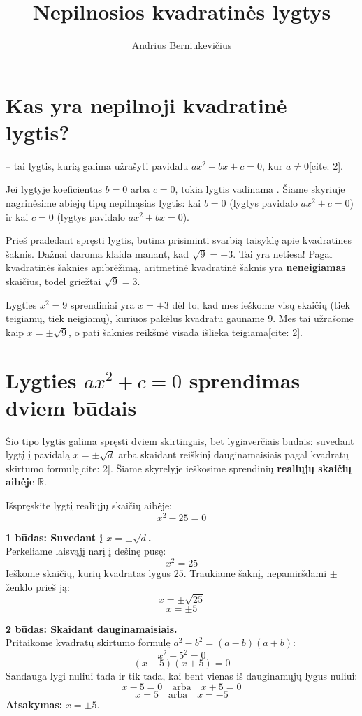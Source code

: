 \documentclass[11pt,a4paper]{scrartcl}
\title{Nepilnosios kvadratinės lygtys}
\author{Andrius Berniukevičius}
\begin{document}
\maketitle

\section{Kas yra nepilnoji kvadratinė lygtis?}

\begin{definition}
 -- tai lygtis, kurią galima užrašyti pavidalu $ax^2+bx+c=0$, kur $a \neq 0$[cite: 2].
\end{definition}

Jei lygtyje koeficientas $b=0$ arba $c=0$, tokia lygtis vadinama . Šiame skyriuje nagrinėsime abiejų tipų nepilnąsias lygtis: kai $b=0$ (lygtys pavidalo $ax^2+c=0$) ir kai $c=0$ (lygtys pavidalo $ax^2+bx=0$).

\begin{remark}
Prieš pradedant spręsti lygtis, būtina prisiminti svarbią taisyklę apie kvadratines šaknis. Dažnai daroma klaida manant, kad $\sqrt{9} = \pm 3$. Tai yra netiesa! Pagal kvadratinės šaknies apibrėžimą, aritmetinė kvadratinė šaknis yra \textbf{neneigiamas} skaičius, todėl griežtai $\sqrt{9} = 3$. 

Lygties $x^2 = 9$ sprendiniai yra $x = \pm 3$ dėl to, kad mes ieškome visų skaičių (tiek teigiamų, tiek neigiamų), kuriuos pakėlus kvadratu gauname $9$. Mes tai užrašome kaip $x = \pm\sqrt{9}$, o pati šaknies reikšmė visada išlieka teigiama[cite: 2].
\end{remark}

\section{Lygties $ax^2+c=0$ sprendimas dviem būdais}

Šio tipo lygtis galima spręsti dviem skirtingais, bet lygiaverčiais būdais: suvedant lygtį į pavidalą $x = \pm\sqrt{d}$ arba skaidant reiškinį dauginamaisiais pagal kvadratų skirtumo formulę[cite: 2]. Šiame skyrelyje ieškosime sprendinių \textbf{realiųjų skaičių aibėje} $\mathbb{R}$.

\begin{example}
Išspręskite lygtį realiųjų skaičių aibėje:
\[ x^2 - 25 = 0 \]
\end{example}
\begin{solution}
\textbf{1 būdas: Suvedant į $x = \pm\sqrt{d}$.}\\
Perkeliame laisvąjį narį į dešinę pusę:
\[ x^2 = 25 \]
Ieškome skaičių, kurių kvadratas lygus $25$. Traukiame šaknį, nepamiršdami $\pm$ ženklo prieš ją:
\[ x = \pm\sqrt{25} \]
\[ x = \pm 5 \]

\textbf{2 būdas: Skaidant dauginamaisiais.}\\
Pritaikome kvadratų skirtumo formulę $a^2 - b^2 = (a-b)(a+b)$:
\[ x^2 - 5^2 = 0 \]
\[ (x-5)(x+5) = 0 \]
Sandauga lygi nuliui tada ir tik tada, kai bent vienas iš dauginamųjų lygus nuliui:
\[ x-5 = 0 \quad \text{arba} \quad x+5 = 0 \]
\[ x = 5 \quad \text{arba} \quad x = -5 \]
\textbf{Atsakymas:} $x = \pm 5$.
\end{solution}
\end{document}
